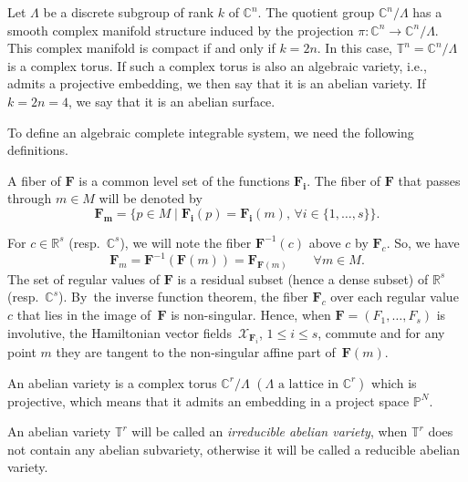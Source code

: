 \documentclass[10pt,a4paper]{amsart}
\numberwithin{equation}{section}
\begin{document}
 Let $\Lambda$ be a discrete subgroup of rank $k$ of
$\mathbb{C}^n$. The quotient group $\mathbb{C}^n/ \Lambda$ has a
smooth complex manifold structure induced by the projection
$\pi\colon \mathbb{C}^n\longrightarrow \mathbb{C}^n/ \Lambda$. This
complex manifold is compact if and only if $k=2n$. In this case,
$\mathbb{T}^n=\mathbb{C}^n/ \Lambda$ is a complex torus. If such a
complex torus is also an algebraic variety, i.e., admits a projective
embedding, we then say that it is an abelian variety. If $k=2n=4$,
we say that it is an abelian surface.

To define an algebraic complete integrable system, we need the
following definitions.

\begin{Definition} A fiber of $\mathbf{F}$ is a common level set of the functions
$\mathbf{F_i}$. The fiber of $\mathbf{F}$ that passes through
$m\in M$ will be denoted by \[\mathbf{F_m}=\{p\in
M\mid \mathbf{F_i}(p)=\mathbf{F_i}(m),\, \forall i
\in \{1,\dots,s\}\}.\]
\end{Definition}

For $c\in \mathbb{R}^s$ (resp.\ $\mathbb{C}^s$), we will note the
fiber $\mathbf{F}^{-1}(c)$ above $c$ by
$\mathbf{F}_c$. So, we have
\[\mathbf{F}_m=\mathbf{F}^{-1}(\mathbf{F}(m))=\mathbf{F}_{\mathbf{F} (m)}\qquad \forall m \in M.\]
The set of regular values of $\mathbf{F}$ is a residual
subset (hence a dense subset) of $\mathbb{R}^s$ (resp.\
$\mathbb{C}^s$). By~the inverse function theorem, the fiber
$\mathbf{F}_c$ over each regular value $c$ that lies in the
image of~$\mathbf{F}$ is non-singular. Hence, when
$\mathbf{F}=(F_1,\dots,F_s)$ is involutive, the
Hamiltonian vector fields~$\mathcal{X}_{\mathbf{F}_i }$,
$1\leq i \leq s$, commute and for any point $m$ they
are tangent to the non-singular affine part of~$\mathbf{F}(m)$.

\begin{Definition}
An abelian variety is a complex torus $\mathbb{C}^r/\Lambda$
$(\Lambda \mbox{ a lattice in } \mathbb{C}^r)$ which is
projective, which means that it admits an embedding in a project
space $\mathbb{P}^N$.
\end{Definition}

An abelian variety $\mathbb{T}^r$ will be called an
\textit{irreducible abelian variety}, when $\mathbb{T}^r$ does not
contain any abelian subvariety, otherwise it will be called a
reducible abelian variety.
\end{document}
